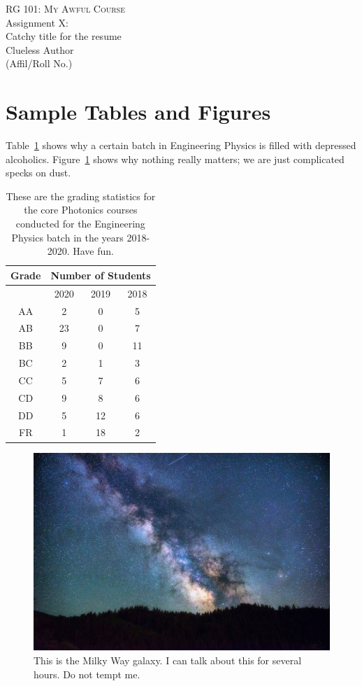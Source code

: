 \documentclass[10pt]{article}
\begin{document}
	\begin{center}
		\normalsize{\textsc{RG 101: My Awful Course}}\\[0.5em]
		\Large{Assignment X: \\}
		\LARGE{Catchy title for the resume}\\[0.75em]
		\large{Clueless Author\\(Affil/Roll No.)}
	\end{center}

\section{Sample Tables and Figures}
Table~\ref{tab:grades} shows why a certain batch in Engineering Physics is filled with depressed alcoholics. Figure~\ref{fig:galaxy} shows why nothing really matters; we are just complicated specks on dust.
\begin{table}[!h]
	\centering
	\begin{tabular}{c c c c}
		\toprule
		\toprule
		Grade & \multicolumn{3}{c}{Number of Students}\\
		\midrule[0.01pt]
		{} & 2020 & 2019 & 2018\\
		\midrule
		AA & 2 & 0 & 5 \\
		AB & 23& 0 & 7 \\
		BB & 9 & 0 & 11\\
		BC & 2 & 1 & 3 \\
		CC & 5 & 7 & 6 \\
		CD & 9 & 8 & 6 \\
		DD & 5 & 12& 6 \\
		FR & 1 & 18& 2 \\
		\midrule
		\bottomrule
	\end{tabular}
	\caption{These are the grading statistics for the core Photonics courses conducted for the Engineering Physics batch in the years 2018-2020. Have fun.}
	\label{tab:grades}
\end{table}

\begin{figure}[!h]
	\centering
	\includegraphics[width=\linewidth]{milky_way.jpg}
	\caption{This is the Milky Way galaxy. I can talk about this for several hours. Do not tempt me.}
	\label{fig:galaxy}
\end{figure}
\end{document}
